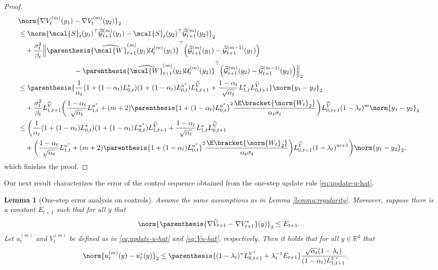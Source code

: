 \documentclass{article}
\newtheorem{Lemma}[Theorem]{Lemma}
\newcommand{\R}{\mathbb{R}}
\begin{document}
\begin{proof}
\begin{align*}
     & \norm{\nabla V_t^{(m)}(y_1) - \nabla V_t^{(m)} (y_2)}_2 \\ & \leq \norm{\mcal{S}_t(y_{1})^{\top}\widehat{\mathcal{G}}_{t+1}^{(m)}(y_{1}) - \mcal{S}_t(y_{2})^{\top}\widehat{\mathcal{G}}_{t+1}^{(m)}(y_{2})}_2 \\ & \quad + \frac{\sigma_t^2}{\beta_t}\Big\| \parenthesis{\widehat{\mcal{W}}_{t+1}^{{(m)}}(y_1) \mathcal{U}^{(m)}_t(y_1)}^\top \Big(\widehat{\mathcal{G}}_{t+1}^{(m)}(y_1)-\widehat{\mathcal{G}}_{t+1}^{(m-1)}(y_1)\Big) \\ & \qquad\qquad\qquad\qquad - \parenthesis{\widehat{\mcal{W}}_{t+1}^{{(m)}}(y_2) \mathcal{U}^{(m)}_t(y_2)}^\top \Big(\widehat{\mathcal{G}}_{t+1}^{(m)}(y_2)-\widehat{\mathcal{G}}_{t+1}^{(m-1)}(y_2)\Big)\Big\|_2 \\ & \leq \parenthesis{\frac{1}{\alpha_{t}}(1 + (1 - \alpha_{t})L_{0, t}^s)(1 + (1 - \alpha_{t})L_{0, t}^{u^*})L_{1,t+1}^{\widehat{V}} + \frac{1 - \alpha_{t}}{\sqrt{\alpha_{t}}}L_{1,t}^s L_{0, t+1}^{\widehat{V}}}\norm{y_{1} - y_{2}}_{2} \\ & \quad + \frac{\sigma_t^2}{\beta_t}L_{1, t+1}^{\widehat{V}}\bigg(\frac{1 - \alpha_{t}}{\sqrt{\alpha_{t}}} L_{1, t}^{u^{*}}  + (m+2)\parenthesis{1 + (1 - \alpha_{t})L_{0,t}^{u^{*}}}^{2}\frac{\E\bracket{\norm{W_{t}}_2}}{\alpha_t\sigma_{t}}\bigg)L_{0, t+1}^{\widehat{V}}( 1- \lambda_t)^{m}\norm{y_1 - y_2}_2 \\ & \leq \bigg(\frac{1}{\alpha_{t}}(1 + (1 - \alpha_{t})L_{0, t}^s)(1 + (1 - \alpha_{t})L_{0, t}^{u^*})L_{1,t+1}^{\widehat{V}} + \frac{1 - \alpha_{t}}{\sqrt{\alpha_{t}}}L_{1,t}^s L_{0, t+1}^{\widehat{V}} \\ & \quad + \bigg(\frac{1 - \alpha_{t}}{\sqrt{\alpha_{t}}} L_{1, t}^{u^{*}}  + (m+2)\parenthesis{1 + (1 - \alpha_{t})L_{0,t}^{u^{*}}}^{2}\frac{\E\bracket{\norm{W_{t}}_2}}{\alpha_t\sigma_{t}}\bigg)L_{0, t+1}^{\widehat{V}}( 1- \lambda_t)^{m+1}\bigg)\norm{y_1 - y_2}_2, 
\end{align*}
which finishes the proof. 
\end{proof}

Our next result characterizes the error of the control sequence obtained from the one-step update rule \eqref{eq:update-u-hat}.
\begin{Lemma}[One-step error analysis on controls]\label{lemma:un-u*-error}
    Assume the same assumptions as in Lemma \ref{lemma:regularity}.
    Moreover, suppose there is a constant $E_{t+1}$ such that for all $y$ that
    \begin{align*}
        \norm{\parenthesis{\nabla \widehat{V}_{t+1} - \nabla V^{*}_{t+1}}(y)}_2 \leq E_{t+1}.
    \end{align*}
    Let $u_t^{(m)}$ and $V_t^{(m)}$ be defined as in \eqref{eq:update-u-hat} and \eqref{eq:Vn-hat}, respectively. Then it holds that for all $y\in \R^d$ that
    \begin{align*}
    \norm{u_{t}^{(m)}(y) - u_{t}^{*}(y)}_{2} &  \leq \parenthesis{(1 - \lambda_t)^n  L_{0,t+1}^{V^*} + \lambda_t^{-1}E_{t+1}} \frac{\sqrt{\alpha_{t}}(1 - \lambda_t)}{(1 - \alpha_{t})L_{1, t+1}^{V^*}}.
\end{align*}
\end{Lemma}
\end{document}
